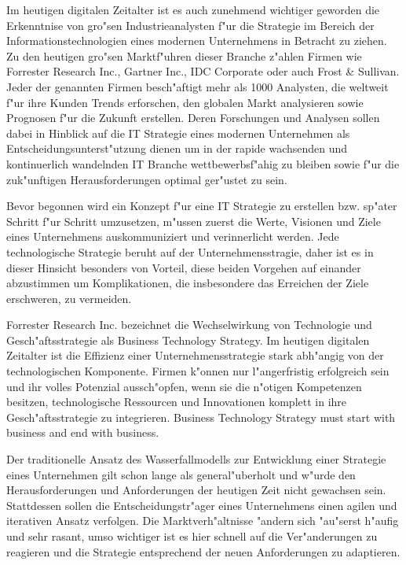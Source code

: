 Im heutigen digitalen Zeitalter ist es auch zunehmend wichtiger geworden die Erkenntnise von gro"sen Industrieanalysten f"ur die Strategie im Bereich der Informationstechnologien eines modernen Unternehmens in Betracht zu ziehen. Zu den heutigen gro"sen Marktf"uhren dieser Branche z"ahlen Firmen wie Forrester Research Inc., Gartner Inc., IDC Corporate oder auch Frost \& Sullivan. Jeder der genannten Firmen besch"aftigt mehr als 1000 Analysten, die weltweit f"ur ihre Kunden Trends erforschen, den globalen Markt analysieren sowie Prognosen f"ur die Zukunft erstellen. Deren Forschungen und Analysen sollen dabei in Hinblick auf die IT Strategie eines modernen Unternehmen als Entscheidungsunterst"utzung dienen um in der rapide wachsenden und kontinuerlich wandelnden IT Branche wettbewerbsf"ahig zu bleiben sowie f"ur die zuk"unftigen Herausforderungen optimal ger"ustet zu sein. 

Bevor begonnen wird ein Konzept f"ur eine IT Strategie zu erstellen bzw. sp"ater Schritt f"ur Schritt umzusetzen, m"ussen zuerst die Werte, Visionen und Ziele eines Unternehmens auskommuniziert und verinnerlicht werden. Jede technologische Strategie beruht auf der Unternehmensstragie, daher ist es in dieser Hinsicht besonders von Vorteil, diese beiden Vorgehen auf einander abzustimmen um Komplikationen, die insbesondere das Erreichen der Ziele erschweren, zu vermeiden.
 
Forrester Research Inc. bezeichnet die Wechselwirkung von Technologie und Gesch"aftsstrategie als Business Technology Strategy. Im heutigen digitalen Zeitalter ist die Effizienz einer Unternehmensstrategie stark abh"angig von der technologischen Komponente. Firmen k"onnen nur l"angerfristig erfolgreich sein und ihr volles Potenzial aussch"opfen, wenn sie die n"otigen Kompetenzen besitzen, technologische Ressourcen und Innovationen komplett in ihre Gesch"aftsstrategie zu integrieren. \glqq Business Technology Strategy must start with business and end with business. \grqq  

Der traditionelle Ansatz des Wasserfallmodells zur Entwicklung einer Strategie eines Unternehmen gilt schon lange als general"uberholt und w"urde den Herausforderungen und Anforderungen der heutigen Zeit nicht gewachsen sein. Stattdessen sollen die Entscheidungstr"ager eines Unternehmens einen agilen und iterativen Ansatz verfolgen. Die Marktverh"altnisse "andern sich "au"serst h"aufig und sehr rasant, umso wichtiger ist es hier schnell auf die Ver"anderungen zu reagieren und die Strategie entsprechend der neuen Anforderungen zu adaptieren\cite{ForresterResearch}. 